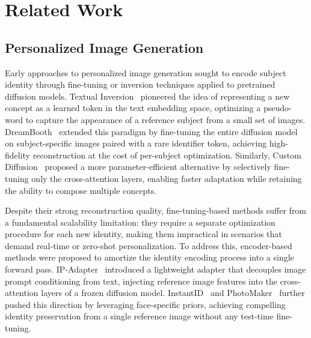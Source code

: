 \documentclass{article}
\begin{document}
\section{Related Work}

\subsection{Personalized Image Generation}
Early approaches to personalized image generation sought to encode subject identity through fine-tuning or inversion techniques applied to pretrained diffusion models. Textual Inversion~\cite{gal2022image} pioneered the idea of representing a new concept as a learned token in the text embedding space, optimizing a pseudo-word to capture the appearance of a reference subject from a small set of images. DreamBooth~\cite{ruiz2023dreambooth} extended this paradigm by fine-tuning the entire diffusion model on subject-specific images paired with a rare identifier token, achieving high-fidelity reconstruction at the cost of per-subject optimization. Similarly, Custom Diffusion~\cite{kumari2023multi} proposed a more parameter-efficient alternative by selectively fine-tuning only the cross-attention layers, enabling faster adaptation while retaining the ability to compose multiple concepts.

Despite their strong reconstruction quality, fine-tuning-based methods suffer from a fundamental scalability limitation: they require a separate optimization procedure for each new identity, making them impractical in scenarios that demand real-time or zero-shot personalization. To address this, encoder-based methods were proposed to amortize the identity encoding process into a single forward pass. IP-Adapter~\cite{ye2023ip} introduced a lightweight adapter that decouples image prompt conditioning from text, injecting reference image features into the cross-attention layers of a frozen diffusion model. InstantID~\cite{wang2024instantid} and PhotoMaker~\cite{li2024photomaker} further pushed this direction by leveraging face-specific priors, achieving compelling identity preservation from a single reference image without any test-time fine-tuning.
\end{document}
